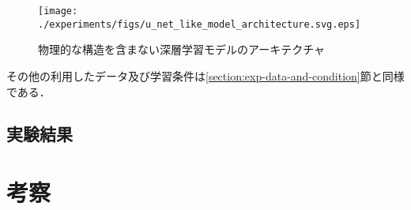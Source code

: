 \begin{figure}[bp]
  \centering
  \texttt{[image: ./experiments/figs/u\_net\_like\_model\_architecture.svg.eps]}
  \caption{物理的な構造を含まない深層学習モデルのアーキテクチャ}
  \label{fig:exp-u-net-like-model}
\end{figure}

その他の利用したデータ及び学習条件は\ref{section:exp-data-and-condition}節と同様である．

\subsection{実験結果 \label{subsection:exp-results-without-physicial-structure}}


\section{考察 \label{section:exp-discussion}}
